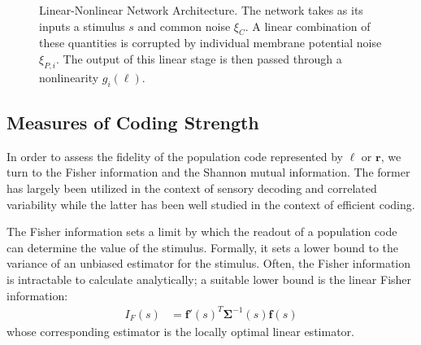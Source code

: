 \documentclass[11pt]{article}
\begin{document}
\begin{figure}[ht]
{}

		\caption{Linear-Nonlinear Network Architecture. The network takes as its inputs a stimulus $s$ and common noise $\xi_C$. A linear combination of these quantities is corrupted by individual membrane potential noise $\xi_{P,i}$. The output of this linear stage is then passed through a nonlinearity $g_i(\ell)$.}
		\label{architecture}
	\end{figure}
	
	\subsection{Measures of Coding Strength}
	In order to assess the fidelity of the population code represented by $\boldsymbol{\ell}$ or $\mathbf{r}$, we turn to the Fisher information and the Shannon mutual information. The former has largely been utilized in the context of sensory decoding and correlated variability \cite{2016kohn} while the latter has been well studied in the context of efficient coding. 
	
	The Fisher information sets a limit by which the readout of a population code can determine the value of the stimulus. Formally, it sets a lower bound to the variance of an unbiased estimator for the stimulus. Often, the Fisher information is intractable to calculate analytically; a suitable lower bound is the linear Fisher information:
	\begin{align}
		I_F(s) &= \mathbf{f}'(s)^T \boldsymbol{\Sigma}^{-1}(s) \mathbf{f}(s)
	\end{align}
	whose corresponding estimator is the locally optimal linear estimator. 
	
\end{document}
